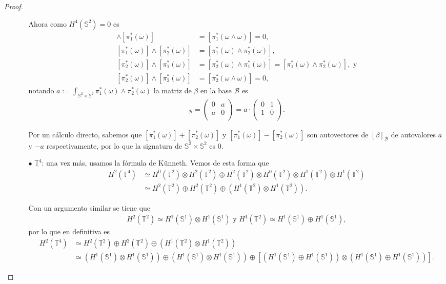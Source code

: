 \documentclass[11pt]{article}
\newcommand{\Ss}{\mathbb{S}}
\newcommand{\T}{\mathbb{T}}
\begin{document}
\begin{proof}
\begin{itemize}[listparindent = \parindent]
\begin{itemize}[listparindent = \parindent]
Ahora como $H^4(\Ss^2) = 0$ es
\begin{align*}
[\pi_1^*(\omega)] \wedge [\pi_1^*(\omega)] &= [\pi_1^*(\omega \wedge \omega)] = 0,\\
[\pi_1^*(\omega)] \wedge [\pi_2^*(\omega)] &= [\pi_1^*(\omega) \wedge \pi_2^*(\omega)],\\
[\pi_2^*(\omega)] \wedge [\pi_1^*(\omega)] &= [\pi_2^*(\omega) \wedge \pi_1^*(\omega)] = [\pi_1^*(\omega) \wedge \pi_2^*(\omega)], \text{ y}\\
[\pi_2^*(\omega)] \wedge [\pi_2^*(\omega)] &= [\pi_2^*(\omega \wedge \omega)] = 0,
\end{align*}
notando $a := \int_{\Ss^2 \times \Ss^2}\pi_1^*(\omega) \wedge \pi_2^*(\omega)$ la matriz de $\beta$ en la base $\mathscr{B}$ es
\begin{align*}
[\beta]_{\mathscr{B}} = \begin{pmatrix}
0 & a\\
a & 0\\
\end{pmatrix} = a \cdot \begin{pmatrix}
0 & 1\\
1 & 0\\
\end{pmatrix}.
\end{align*}

Por un cálculo directo, sabemos que $[\pi_1^*(\omega)]+[\pi_2^*(\omega)]$ y $[\pi_1^*(\omega)]-[\pi_2^*(\omega)]$ son autovectores de $[\beta]_{\mathscr{B}}$ de autovalores $a$ y $-a$ respectivamente, por lo que la signatura de $\Ss^2 \times \Ss^2$ es $0$.
\item[$\bullet$] $\underline{\T^4}$: una vez más, usamos la fórmula de Künneth. Vemos de esta forma que 
\begin{align*}
H^2(\T^4) &\simeq H^0(\T^2) \otimes H^2(\T^2) \oplus H^2(\T^2) \otimes H^0(\T^2) \otimes H^1(\T^2) \otimes H^1(\T^2)\\
&\simeq  H^2(\T^2) \oplus H^2(\T^2) \oplus (H^1(\T^2) \otimes H^1(\T^2)).
\end{align*}

Con un argumento similar se tiene que
\begin{align*}
H^2(\T^2) \simeq H^1(\Ss^1) \otimes H^1(\Ss^1) \text{ y }
H^1(\T^2) \simeq H^1(\Ss^1) \oplus H^1(\Ss^1),
\end{align*}
por lo que en definitiva es
\begin{align*}
H^2(\T^4) &\simeq  H^2(\T^2) \oplus H^2(\T^2) \oplus (H^1(\T^2) \otimes H^1(\T^2))\\
&\simeq (H^1(\Ss^1) \otimes H^1(\Ss^1)) \oplus (H^1(\Ss^1) \otimes H^1(\Ss^1)) \oplus [(H^1(\Ss^1) \oplus H^1(\Ss^1)) \otimes (H^1(\Ss^1) \oplus H^1(\Ss^1))].
\end{align*}


\end{itemize}
\end{itemize}
\end{proof}
\end{document}
